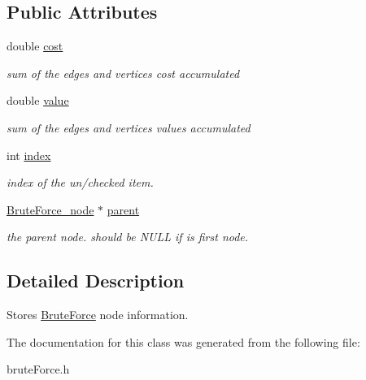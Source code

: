 \subsection*{Public Attributes}
\begin{DoxyCompactItemize}
\item 
\hypertarget{class_brute_force__node_a0d93e3e7884d87d08ac9a082e581e76e}{}double \hyperlink{class_brute_force__node_a0d93e3e7884d87d08ac9a082e581e76e}{cost}\label{class_brute_force__node_a0d93e3e7884d87d08ac9a082e581e76e}

\begin{DoxyCompactList}\small\item\em sum of the edges and vertices cost accumulated \end{DoxyCompactList}\item 
\hypertarget{class_brute_force__node_a372846f04cf2d57b6d08dd567edb5aa1}{}double \hyperlink{class_brute_force__node_a372846f04cf2d57b6d08dd567edb5aa1}{value}\label{class_brute_force__node_a372846f04cf2d57b6d08dd567edb5aa1}

\begin{DoxyCompactList}\small\item\em sum of the edges and vertices values accumulated \end{DoxyCompactList}\item 
\hypertarget{class_brute_force__node_a9b304b9a8fa18d5375d918724be1d609}{}int \hyperlink{class_brute_force__node_a9b304b9a8fa18d5375d918724be1d609}{index}\label{class_brute_force__node_a9b304b9a8fa18d5375d918724be1d609}

\begin{DoxyCompactList}\small\item\em index of the un/checked item. \end{DoxyCompactList}\item 
\hypertarget{class_brute_force__node_adb55f9527682707394b04e9474efc2cc}{}\hyperlink{class_brute_force__node}{Brute\+Force\+\_\+node} $\ast$ \hyperlink{class_brute_force__node_adb55f9527682707394b04e9474efc2cc}{parent}\label{class_brute_force__node_adb55f9527682707394b04e9474efc2cc}

\begin{DoxyCompactList}\small\item\em the parent node. should be N\+U\+L\+L if is first node. \end{DoxyCompactList}\end{DoxyCompactItemize}


\subsection{Detailed Description}
Stores \hyperlink{class_brute_force}{Brute\+Force} node information. 

The documentation for this class was generated from the following file\+:\begin{DoxyCompactItemize}
\item 
brute\+Force.\+h\end{DoxyCompactItemize}
